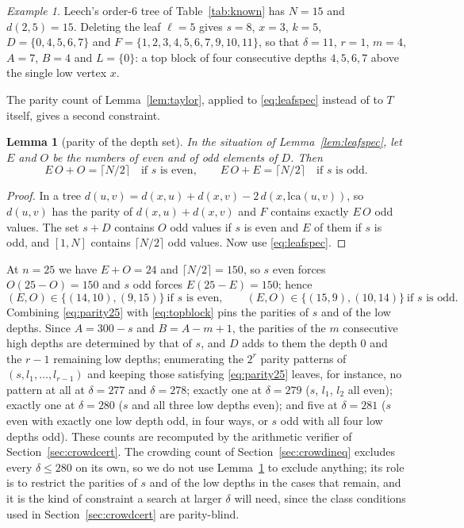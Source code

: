 \documentclass[11pt,a4paper]{article}
\theoremstyle{plain}
\newtheorem{lemma}[theorem]{Lemma}
\theoremstyle{remark}
\newtheorem{example}[theorem]{Example}
\begin{document}
\begin{example}\label{ex:doublestar}
Leech's order-$6$ tree of Table~\ref{tab:known} has $N=15$ and $d(2,5)=15$.
Deleting the leaf $\ell=5$ gives $s=8$, $x=3$, $k=5$, $D=\{0,4,5,6,7\}$ and
$F=\{1,2,3,4,5,6,7,9,10,11\}$, so that $\delta=11$, $r=1$, $m=4$, $A=7$,
$B=4$ and $L=\{0\}$: a top block of four consecutive depths $4,5,6,7$ above
the single low vertex $x$.
\end{example}

The parity count of Lemma~\ref{lem:taylor}, applied to \eqref{eq:leafspec}
instead of to $T$ itself, gives a second constraint.

\begin{lemma}[parity of the depth set]\label{lem:crowdparity}
In the situation of Lemma~\ref{lem:leafspec}, let $E$ and $O$ be the numbers of
even and of odd elements of $D$.  Then
\[
  E\,O+O=\lceil N/2\rceil\quad\text{if $s$ is even},\qquad
  E\,O+E=\lceil N/2\rceil\quad\text{if $s$ is odd}.
\]
\end{lemma}

\begin{proof}
In a tree $d(u,v)=d(x,u)+d(x,v)-2\,d(x,\mathrm{lca}(u,v))$, so $d(u,v)$ has the
parity of $d(x,u)+d(x,v)$ and $F$ contains exactly $E\,O$ odd values.  The set
$s+D$ contains $O$ odd values if $s$ is even and $E$ of them if $s$ is odd, and
$[1,N]$ contains $\lceil N/2\rceil$ odd values.  Now use \eqref{eq:leafspec}.
\end{proof}

At $n=25$ we have $E+O=24$ and $\lceil N/2\rceil=150$, so $s$ even forces
$O(25-O)=150$ and $s$ odd forces $E(25-E)=150$; hence
\begin{equation}\label{eq:parity25}
  (E,O)\in\{(14,10),(9,15)\}\ \text{if $s$ is even},\qquad
  (E,O)\in\{(15,9),(10,14)\}\ \text{if $s$ is odd}.
\end{equation}
Combining \eqref{eq:parity25} with \eqref{eq:topblock} pins the parities of
$s$ and of the low depths.  Since $A=300-s$ and $B=A-m+1$, the parities of the
$m$ consecutive high depths are determined by that of $s$, and $D$ adds to them
the depth $0$ and the $r-1$ remaining low depths; enumerating the $2^r$ parity
patterns of $(s,l_1,\dots,l_{r-1})$ and keeping those satisfying
\eqref{eq:parity25} leaves, for instance, no pattern at all at $\delta=277$ and
$\delta=278$; exactly one at $\delta=279$ ($s$, $l_1$, $l_2$ all even); exactly
one at $\delta=280$ ($s$ and all three low depths even); and five at
$\delta=281$ ($s$ even with exactly one low depth odd, in four ways, or $s$ odd
with all four low depths odd).  These counts are recomputed by the arithmetic
verifier of Section~\ref{sec:crowdcert}.  The crowding count of
Section~\ref{sec:crowdineq} excludes every $\delta\le280$ on its own, so we do
not use Lemma~\ref{lem:crowdparity} to exclude anything; its role is to
restrict the parities of $s$ and of the low depths in the cases that remain, and
it is the kind of constraint a search at larger $\delta$ will need, since the
class conditions used in Section~\ref{sec:crowdcert} are parity-blind.
\end{document}
